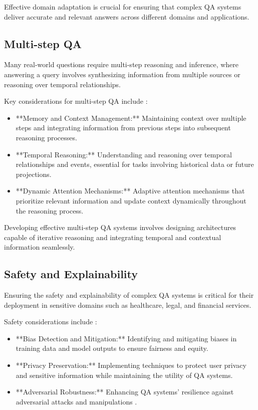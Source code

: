 \documentclass[a4paper,12pt]{article}
\begin{document}
Effective domain adaptation is crucial for ensuring that complex QA systems deliver accurate and relevant answers across different domains and applications.

\subsection{Multi-step QA}
\label{subsec:multi_step_qa}

Many real-world questions require multi-step reasoning and inference, where answering a query involves synthesizing information from multiple sources or reasoning over temporal relationships.

Key considerations for multi-step QA include \cite{transformers_paper}:

\begin{itemize}
    \item **Memory and Context Management:** Maintaining context over multiple steps and integrating information from previous steps into subsequent reasoning processes.
    \item **Temporal Reasoning:** Understanding and reasoning over temporal relationships and events, essential for tasks involving historical data or future projections.
    \item **Dynamic Attention Mechanisms:** Adaptive attention mechanisms that prioritize relevant information and update context dynamically throughout the reasoning process.
\end{itemize}

Developing effective multi-step QA systems involves designing architectures capable of iterative reasoning and integrating temporal and contextual information seamlessly.

\subsection{Safety and Explainability}
\label{subsec:safety_explainability}

Ensuring the safety and explainability of complex QA systems is critical for their deployment in sensitive domains such as healthcare, legal, and financial services.

Safety considerations include \cite{explainable_ai_paper}:

\begin{itemize}
    \item **Bias Detection and Mitigation:** Identifying and mitigating biases in training data and model outputs to ensure fairness and equity.
    \item **Privacy Preservation:** Implementing techniques to protect user privacy and sensitive information while maintaining the utility of QA systems.
    \item **Adversarial Robustness:** Enhancing QA systems' resilience against adversarial attacks and manipulations \cite{gpt3_paper}.
\end{itemize}
\end{document}
